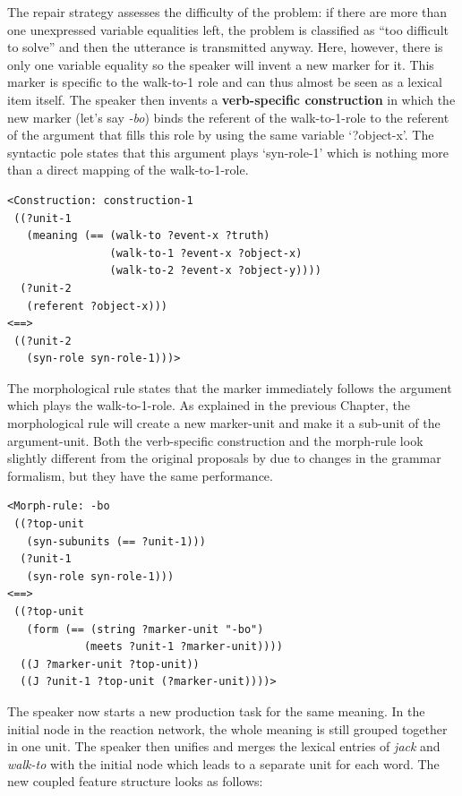 The repair strategy assesses the difficulty of the problem: if there are more than one unexpressed variable equalities left, the problem is classified as ``too difficult to solve'' and then the utterance is transmitted anyway. Here, however, there is only one variable equality so the speaker will invent a new marker for it. This marker is specific to the walk-to-1 role and can thus almost be seen as a lexical item itself. The speaker then invents a {\bfseries verb-specific construction} in which the new marker (let's say {\em -bo}) binds the referent of the walk-to-1-role to the referent of the argument that fills this role by using the same variable `?object-x'. The syntactic pole states that this argument plays `syn-role-1' which is nothing more than a direct mapping of the walk-to-1-role.


\ea
\begin{lstlisting}
<Construction: construction-1
 ((?unit-1
   (meaning (== (walk-to ?event-x ?truth)
                (walk-to-1 ?event-x ?object-x)
                (walk-to-2 ?event-x ?object-y))))
  (?unit-2
   (referent ?object-x)))
<==>
 ((?unit-2
   (syn-role syn-role-1)))>
\end{lstlisting}
\z


The morphological rule states that the marker immediately follows the argument which plays the walk-to-1-role. As explained in the previous Chapter, the morphological rule will create a new marker-unit and make it a sub-unit of the argument-unit. Both the verb-specific construction and the morph-rule look slightly different from the original proposals by \citet{steels02simulating} due to changes in the grammar formalism, but they have the same performance.


\ea
\begin{lstlisting}
<Morph-rule: -bo
 ((?top-unit
   (syn-subunits (== ?unit-1)))
  (?unit-1
   (syn-role syn-role-1)))
<==>
 ((?top-unit
   (form (== (string ?marker-unit "-bo")
            (meets ?unit-1 ?marker-unit))))
  ((J ?marker-unit ?top-unit))
  ((J ?unit-1 ?top-unit (?marker-unit))))>
\end{lstlisting}
\z


The speaker now starts a new production task for the same meaning. In the initial node in the reaction network, the whole meaning is still grouped together in one unit. The speaker then unifies and merges the lexical entries of {\em jack} and {\em walk-to} with the initial node which leads to a separate unit for each word. The new coupled feature structure looks as follows:


